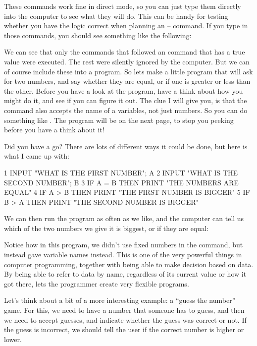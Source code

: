 \needspace{4cm}
These commands work fine in direct mode, so you can just type them
directly into the computer to see what they will do.  This can be
handy for testing whether you have the logic correct when planning an
 --  command.  If you type in those commands, you
should see something like the following:


We can see that only the  commands that followed an
 command that has a true value were executed. The rest
were silently ignored by the computer.  But we can of course include
these into a program. So lets make a little program that will ask
for two numbers, and say whether they are equal, or if one is greater
or less than the other.  Before you have a look at the program, have
a think about how you might do it, and see if you can figure it out.
The clue I will give you, is that the  command also accepts the name of
a variables, not just numbers. So you can do something like . The program will be on the next page, to stop you peeking before you
have a think about it!

\pagebreak

Did you have a go?  There are lots of different ways it could be done,
but here is what I came up with:

\begin{screenoutput}
1 INPUT "WHAT IS THE FIRST NUMBER"; A
2 INPUT "WHAT IS THE SECOND NUMBER"; B
3 IF A = B THEN PRINT "THE NUMBERS ARE EQUAL"
4 IF A > B THEN PRINT "THE FIRST NUMBER IS BIGGER"
5 IF B > A THEN PRINT "THE SECOND NUMBER IS BIGGER"
\end{screenoutput}

We can then run the program as often as we like, and the computer
can tell us which of the two numbers we give it is biggest, or if they
are equal:


Notice how in this program, we didn't use fixed numbers in the
 command, but instead gave variable names instead.  This is
one of the very powerful things in computer programming, together
with being able to make decision based on data. By being able to refer
to data by name, regardless of its current value or how it got there,
lets the programmer create very flexible programs.

Let's think about a bit of a more interesting example: a ``guess the
number'' game.
For this, we need to have a number that someone has to guess, and then
we need to accept guesses, and indicate whether the guess was correct
or not. If the guess is incorrect, we should tell the user if the
correct number is higher or lower.

